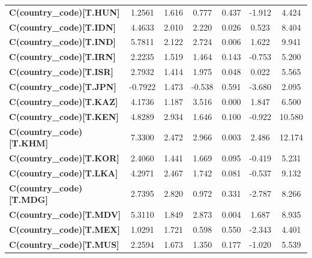 \begin{center}
\begin{tabular}{lcccccc}
\textbf{C(country\_code)[T.HUN]} &       1.2561  &        1.616     &     0.777  &         0.437        &       -1.912    &        4.424     \\
\textbf{C(country\_code)[T.IDN]} &       4.4633  &        2.010     &     2.220  &         0.026        &        0.523    &        8.404     \\
\textbf{C(country\_code)[T.IND]} &       5.7811  &        2.122     &     2.724  &         0.006        &        1.622    &        9.941     \\
\textbf{C(country\_code)[T.IRN]} &       2.2235  &        1.519     &     1.464  &         0.143        &       -0.753    &        5.200     \\
\textbf{C(country\_code)[T.ISR]} &       2.7932  &        1.414     &     1.975  &         0.048        &        0.022    &        5.565     \\
\textbf{C(country\_code)[T.JPN]} &      -0.7922  &        1.473     &    -0.538  &         0.591        &       -3.680    &        2.095     \\
\textbf{C(country\_code)[T.KAZ]} &       4.1736  &        1.187     &     3.516  &         0.000        &        1.847    &        6.500     \\
\textbf{C(country\_code)[T.KEN]} &       4.8289  &        2.934     &     1.646  &         0.100        &       -0.922    &       10.580     \\
\textbf{C(country\_code)[T.KHM]} &       7.3300  &        2.472     &     2.966  &         0.003        &        2.486    &       12.174     \\
\textbf{C(country\_code)[T.KOR]} &       2.4060  &        1.441     &     1.669  &         0.095        &       -0.419    &        5.231     \\
\textbf{C(country\_code)[T.LKA]} &       4.2971  &        2.467     &     1.742  &         0.081        &       -0.537    &        9.132     \\
\textbf{C(country\_code)[T.MDG]} &       2.7395  &        2.820     &     0.972  &         0.331        &       -2.787    &        8.266     \\
\textbf{C(country\_code)[T.MDV]} &       5.3110  &        1.849     &     2.873  &         0.004        &        1.687    &        8.935     \\
\textbf{C(country\_code)[T.MEX]} &       1.0291  &        1.721     &     0.598  &         0.550        &       -2.343    &        4.401     \\
\textbf{C(country\_code)[T.MUS]} &       2.2594  &        1.673     &     1.350  &         0.177        &       -1.020    &        5.539     \\

\end{tabular}
\end{center}
